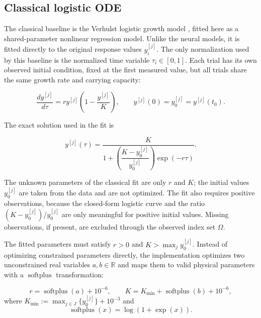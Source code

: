 \subsection{Classical logistic ODE}
            The classical baseline is the Verhulst logistic growth model
    \citep{verhulst1838notice}, fitted here as a shared-parameter nonlinear
    regression model. Unlike the neural models, it is fitted directly to the
    original response values $y_i^{[j]}$. The only normalization used by
    this baseline is the normalized time variable $\tau_i\in[0,1]$. Each
    trial has its own observed initial condition, fixed at the first
    measured value, but all trials share the same growth rate and carrying
    capacity:

    \begin{equation}
        \label{eqn:logisitc_ode}
        \frac{d y^{[j]}}{d\tau}
            =
            r y^{[j]}\left(1-\frac{y^{[j]}}{K}\right),
            \qquad
            y^{[j]}(0)=y_0^{[j]}=y^{[j]}(t_0).
    \end{equation}

    The exact solution used in the fit is

    \begin{equation}
        \label{eqn:sol_det_logistic}
        y^{[j]}(\tau)
            =
            \dfrac{K}{
                1 +
                \left(
                    \dfrac{K - y_0^{[j]}}{ y_0^{[j]} }
                \right)
                \exp(-r\tau)
            }.
    \end{equation}

        The unknown parameters of the classical fit are only $r$ and $K$; the
    initial values $y_0^{[j]}$ are taken from the data and are not
    optimized. The fit also requires positive observations, because the
    closed-form logistic curve and the ratio $(K-y_0^{[j]})/y_0^{[j]}$ are
    only meaningful for positive initial values.
    Missing observations, if present, are excluded through the observed
    index set $\Omega$.

        The fitted parameters must satisfy $r>0$ and $K>\max_j y_0^{[j]}$.
    Instead of optimizing constrained parameters directly, the
    implementation optimizes two unconstrained real variables
    $a, b \in\mathbb R$ and maps them to valid physical parameters with a
    $\operatorname{softplus}$ transformation:

    \begin{equation}
        r = \operatorname{softplus}(a)+10^{-6},
            \qquad
            K = K_{\min} +
            \operatorname{softplus}(b)+10^{-6},
    \end{equation}
    where
    $
        \displaystyle
        K_{\min}
     :=
        \max_{j \in J}
       \Big\{
                y_0^{[j]}
       \Big\}
            +10^{-3}
    $
    and
    $$
        \operatorname{softplus}(x)=\log(1+\exp(x)).
    $$

